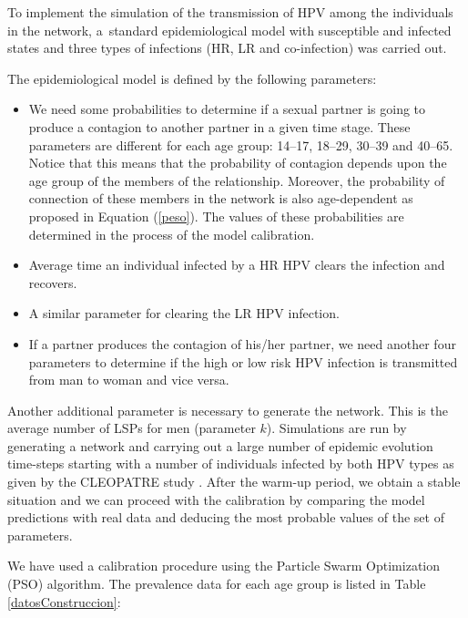 
To implement the simulation of the transmission of HPV among the individuals in the network, a~standard epidemiological model with susceptible and infected states and three types of infections (HR, LR and co-infection) was carried out.

The epidemiological model is defined by the following parameters:

\begin{itemize}[leftmargin=*,labelsep=5mm]
	\item We need some probabilities to determine if a sexual partner is going to produce a contagion to another partner in a given time stage. These parameters are different for each age group:	
	14--17, 18--29, 30--39 and 40--65. Notice that this means that the probability of contagion depends upon the age group of the members of the relationship. Moreover, the probability of connection of these members in the network is also age-dependent as proposed in Equation (\ref{peso}). The values of these probabilities are determined in the process of the model calibration.
	
	\item Average time an individual infected by a HR HPV clears the infection and recovers.
	\item A similar parameter for clearing the LR HPV infection.
	\item If a partner produces the contagion of his/her partner, we need another four parameters to determine if the high or low risk HPV infection is transmitted from man to woman and vice versa. 
\end{itemize}

Another additional parameter is necessary to generate the network. This is the average number of LSPs for men (parameter $k$). Simulations are run by generating a network and carrying out a large number of epidemic evolution time-steps starting with a number of individuals infected by both HPV types as given by the CLEOPATRE study \cite{castellsague2012prevalence}.
After the warm-up period, we obtain a stable situation and we can proceed with the calibration by comparing the model predictions with real data and deducing the most probable values of the set of parameters.

We have used a calibration procedure using the Particle Swarm Optimization (PSO) algorithm. The prevalence data for each age group is listed in Table \ref{datosConstruccion}:

